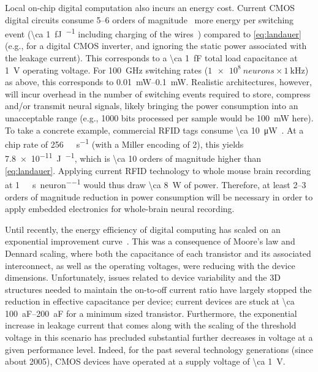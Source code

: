 Local on-chip digital computation also incurs an energy cost.
Current CMOS digital circuits consume 5--6 orders of magnitude~\cite{tucker11,koomey11,yablonovitch08,tucker11b} more energy per switching event (\SI{\ca 1}{\femto\joule\per\bit} including charging of the wires~\cite{tucker11}) compared to \ref{eq:landauer} (e.g., for a digital CMOS inverter, and ignoring the static power associated with the leakage current).
This corresponds to a \SI{\ca 1}{\femto\farad} total load capacitance at \SI{1}{\volt} operating voltage. For \SI{100}{\giga\hertz} switching rates ($\SI{1e8}{neurons} \times \SI{1}{\kilo\hertz}$) as above, this corresponds to \SIrange{0.01}{0.1}{\milli\watt}.
Realistic architectures, however, will incur overhead in the number of switching events required to store, compress and/or transmit neural signals, likely bringing the power consumption into an unacceptable range (e.g., \num{1000} bits processed per sample would be \SI{100}{\milli\watt} here).
To take a concrete example, commercial RFID tags consume \SI{\ca 10}{\micro\watt}~\cite{rfidsheet}.
At a chip rate of \SI{256}{\kilo\bit\per\second} (with a Miller encoding of 2), this yields \SI{7.8e-11}{\joule\per\bit}, which is \num{\ca 10} orders of magnitude higher than \ref{eq:landauer}.
Applying current RFID technology to whole mouse brain recording at \SI{1}{\kilo\bit\per\second\per neuron} would thus draw \SI{\ca 8}{\watt} of power.
Therefore, at least 2--3 orders of magnitude reduction in power consumption will be necessary in order to apply embedded electronics for whole-brain neural recording.

Until recently, the energy efficiency of digital computing has scaled on an exponential improvement curve~\cite{koomey11}.
This was a consequence of Moore's law and Dennard scaling, where both the capacitance of each transistor and its associated interconnect, as well as the operating voltages, were reducing with the device dimensions.
Unfortunately, issues related to device variability and the 3D structures needed to maintain the on-to-off current ratio have largely stopped the reduction in effective capacitance per device; current devices are stuck at \SIrange{\ca 100}{200}{\atto\farad} for a minimum sized transistor.
Furthermore, the exponential increase in leakage current that comes along with the scaling of the threshold voltage in this scenario has precluded substantial further decreases in voltage at a given performance level.
Indeed, for the past several technology generations (since about 2005), CMOS devices have operated at a supply voltage of \SI{\ca 1}{\volt}.

